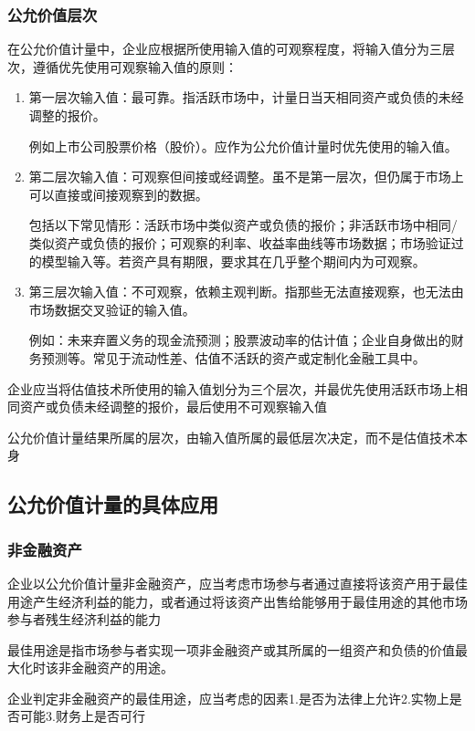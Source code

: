 \documentclass[UTF8,12pt]{ctexart}
\numberwithin{equation}{section} %
\numberwithin{figure}{section}
\numberwithin{table}{section}
\begin{document}
	\subsubsection{公允价值层次}
	在公允价值计量中，企业应根据所使用输入值的可观察程度，将输入值分为三层次，遵循优先使用可观察输入值的原则：
	\begin{enumerate}
		\item 第一层次输入值：最可靠。指活跃市场中，计量日当天相同资产或负债的未经调整的报价。
		
		例如上市公司股票价格（股价）。应作为公允价值计量时优先使用的输入值。
		
		\item 第二层次输入值：可观察但间接或经调整。虽不是第一层次，但仍属于市场上可以直接或间接观察到的数据。
		
		包括以下常见情形：活跃市场中类似资产或负债的报价；非活跃市场中相同/类似资产或负债的报价；可观察的利率、收益率曲线等市场数据；市场验证过的模型输入等。若资产具有期限，要求其在几乎整个期间内为可观察。
		
		\item 第三层次输入值：不可观察，依赖主观判断。指那些无法直接观察，也无法由市场数据交叉验证的输入值。
		
		例如：未来弃置义务的现金流预测；股票波动率的估计值；企业自身做出的财务预测等。常见于流动性差、估值不活跃的资产或定制化金融工具中。
	\end{enumerate}
	
	企业应当将估值技术所使用的输入值划分为三个层次，并最优先使用活跃市场上相同资产或负债未经调整的报价，最后使用不可观察输入值
	
	公允价值计量结果所属的层次，由输入值所属的最低层次决定，而不是估值技术本身
	
	\subsection{公允价值计量的具体应用}
	\subsubsection{非金融资产}
	企业以公允价值计量非金融资产，应当考虑市场参与者通过直接将该资产用于最佳用途产生经济利益的能力，或者通过将该资产出售给能够用于最佳用途的其他市场参与者残生经济利益的能力
	
	最佳用途是指市场参与者实现一项非金融资产或其所属的一组资产和负债的价值最大化时该非金融资产的用途。
	
	企业判定非金融资产的最佳用途，应当考虑的因素1.是否为法律上允许2.实物上是否可能3.财务上是否可行
	
\end{document}
